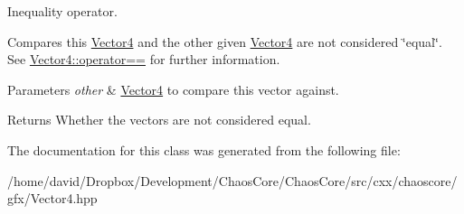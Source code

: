 Inequality operator. 

Compares this \hyperlink{classchaos_1_1gfx_1_1_vector4}{Vector4} and the other given \hyperlink{classchaos_1_1gfx_1_1_vector4}{Vector4} are not considered \char`\"{}equal\char`\"{}. See \hyperlink{classchaos_1_1gfx_1_1_vector4_add5671fb46f71d2196a68e2746309463}{Vector4\-::operator==} for further information.


\begin{DoxyParams}{Parameters}
{\em other} & \hyperlink{classchaos_1_1gfx_1_1_vector4}{Vector4} to compare this vector against. \\
\hline
\end{DoxyParams}
\begin{DoxyReturn}{Returns}
Whether the vectors are not considered equal. 
\end{DoxyReturn}


The documentation for this class was generated from the following file\-:\begin{DoxyCompactItemize}
\item 
/home/david/\-Dropbox/\-Development/\-Chaos\-Core/\-Chaos\-Core/src/cxx/chaoscore/gfx/Vector4.\-hpp\end{DoxyCompactItemize}

